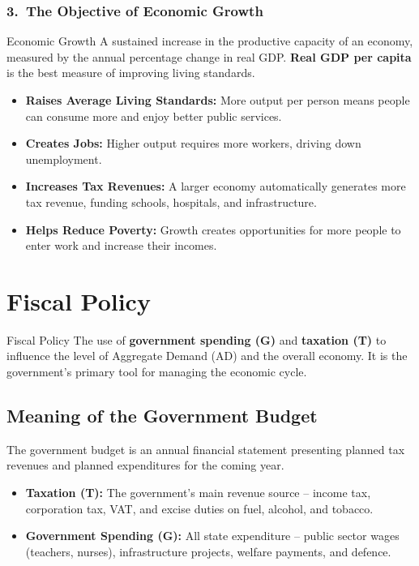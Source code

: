 \documentclass[11pt, a4paper, twoside]{book}
\begin{document}
\subsubsection{3.\ The Objective of Economic Growth}

\begin{keyterm}{Economic Growth}
A sustained increase in the productive capacity of an economy, measured by the annual percentage change in real GDP. \textbf{Real GDP per capita} is the best measure of improving living standards.
\end{keyterm}

\begin{itemize}
  \item \textbf{Raises Average Living Standards:} More output per person means people can consume more and enjoy better public services.
  \item \textbf{Creates Jobs:} Higher output requires more workers, driving down unemployment.
  \item \textbf{Increases Tax Revenues:} A larger economy automatically generates more tax revenue, funding schools, hospitals, and infrastructure.
  \item \textbf{Helps Reduce Poverty:} Growth creates opportunities for more people to enter work and increase their incomes.
\end{itemize}

\section{Fiscal Policy}

\begin{keyterm}{Fiscal Policy}
The use of \textbf{government spending (G)} and \textbf{taxation (T)} to influence the level of Aggregate Demand (AD) and the overall economy. It is the government's primary tool for managing the economic cycle.
\end{keyterm}

\subsection{Meaning of the Government Budget}

The government budget is an annual financial statement presenting planned tax revenues and planned expenditures for the coming year.

\begin{itemize}
  \item \textbf{Taxation (T):} The government's main revenue source -- income tax, corporation tax, VAT, and excise duties on fuel, alcohol, and tobacco.
  \item \textbf{Government Spending (G):} All state expenditure -- public sector wages (teachers, nurses), infrastructure projects, welfare payments, and defence.
\end{itemize}
\end{document}
